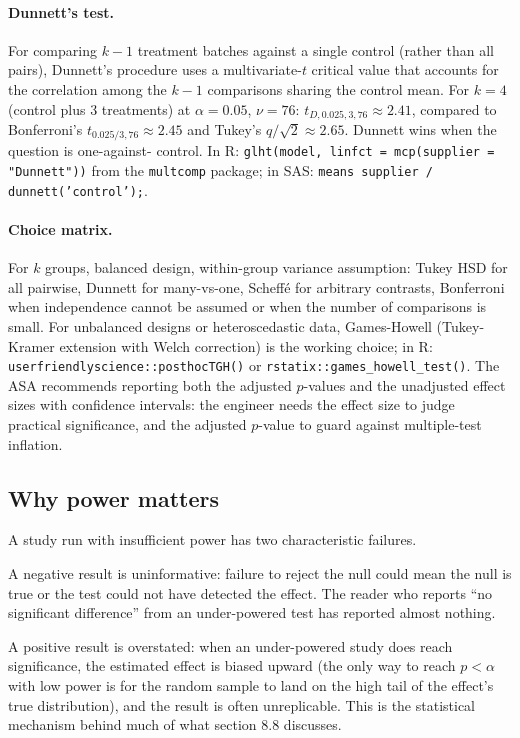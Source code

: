 \paragraph{Dunnett's test.} For comparing $k - 1$ treatment
batches against a single control (rather than all pairs),
Dunnett's procedure uses a multivariate-$t$ critical value
that accounts for the correlation among the $k - 1$ comparisons
sharing the control mean. For $k = 4$ (control plus 3
treatments) at $\alpha = 0.05$, $\nu = 76$: $t_{D, 0.025, 3,
76} \approx 2.41$, compared to Bonferroni's
$t_{0.025/3, 76} \approx 2.45$ and Tukey's $q/\sqrt{2}
\approx 2.65$. Dunnett wins when the question is one-against-
control. In R:
\texttt{glht(model, linfct = mcp(supplier = "Dunnett"))} from
the \texttt{multcomp} package; in SAS:
\texttt{means supplier / dunnett('control');}.

\paragraph{Choice matrix.} For $k$ groups, balanced design,
within-group variance assumption: Tukey HSD for all pairwise,
Dunnett for many-vs-one, Scheffé for arbitrary contrasts,
Bonferroni when independence cannot be assumed or when the
number of comparisons is small. For unbalanced designs or
heteroscedastic data, Games-Howell (Tukey-Kramer extension
with Welch correction) is the working choice; in R:
\texttt{userfriendlyscience::posthocTGH()} or
\texttt{rstatix::games\_howell\_test()}. The ASA
\cite{method:ch08-wasserstein-asa-2016} recommends reporting both the
adjusted $p$-values and the unadjusted effect sizes with
confidence intervals: the engineer needs the effect size to
judge practical significance, and the adjusted $p$-value to
guard against multiple-test inflation.

\subsection{Why power matters}

A study run with insufficient power has two characteristic
failures.

A negative result is uninformative: failure to reject the null could
mean the null is true or the test could not have detected the effect.
The reader who reports ``no significant difference'' from an
under-powered test has reported almost nothing.

A positive result is overstated: when an under-powered study does
reach significance, the estimated effect is biased upward (the only
way to reach $p < \alpha$ with low power is for the random sample to
land on the high tail of the effect's true distribution), and the
result is often unreplicable. This is the statistical mechanism
behind much of what section 8.8 discusses.

